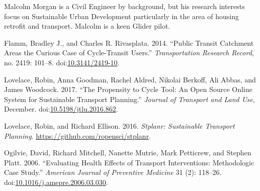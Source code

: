 \documentclass[11pt]{article}
\begin{document}
Malcolm Morgan is a Civil Engineer by background, but his research interests focus on Sustainable Urban Development particularly in the area of housing retrofit and transport. Malcolm is a keen Glider pilot.





\hypertarget{ref-flamm_public_2014}{}
Flamm, Bradley J., and Charles R. Rivasplata. 2014. ``Public Transit
Catchment Areas the Curious Case of Cycle-Transit Users.''
\emph{Transportation Research Record}, no. 2419: 101--8.
doi:\href{https://doi.org/10.3141/2419-10}{10.3141/2419-10}.

\hypertarget{ref-lovelace_propensity_2017}{}
Lovelace, Robin, Anna Goodman, Rachel Aldred, Nikolai Berkoff, Ali
Abbas, and James Woodcock. 2017. ``The Propensity to Cycle Tool: An Open
Source Online System for Sustainable Transport Planning.'' \emph{Journal
of Transport and Land Use}, December.
doi:\href{https://doi.org/10.5198/jtlu.2016.862}{10.5198/jtlu.2016.862}.

\hypertarget{ref-lovelace_stplanr:_2016}{}
Lovelace, Robin, and Richard Ellison. 2016. \emph{Stplanr: Sustainable
Transport Planning}. \url{https://github.com/ropensci/stplanr}.

\hypertarget{ref-ogilvie_evaluating_2006}{}
Ogilvie, David, Richard Mitchell, Nanette Mutrie, Mark Petticrew, and
Stephen Platt. 2006. ``Evaluating Health Effects of Transport
Interventions: Methodologic Case Study.'' \emph{American Journal of
Preventive Medicine} 31 (2): 118--26.
doi:\href{https://doi.org/10.1016/j.amepre.2006.03.030}{10.1016/j.amepre.2006.03.030}.
\end{document}

